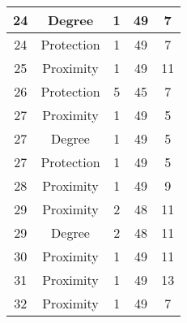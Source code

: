\documentclass[results.tex]{subfiles}
\begin{document}
\begin{center}
\begin{tabular}{| c || c | c | c | c |}
            \hline
            24                      & Degree                       & 1                      & 49                      & 7                    \\
            \hline
            24                      & Protection                   & 1                      & 49                      & 7                    \\
            \hline
            25                      & Proximity                    & 1                      & 49                      & 11                   \\
            \hline
            26                      & Protection                   & 5                      & 45                      & 7                    \\
            \hline
            27                      & Proximity                    & 1                      & 49                      & 5                    \\
            \hline
            27                      & Degree                       & 1                      & 49                      & 5                    \\
            \hline
            27                      & Protection                   & 1                      & 49                      & 5                    \\
            \hline
            28                      & Proximity                    & 1                      & 49                      & 9                    \\
            \hline
            29                      & Proximity                    & 2                      & 48                      & 11                   \\
            \hline
            29                      & Degree                       & 2                      & 48                      & 11                   \\
            \hline
            30                      & Proximity                    & 1                      & 49                      & 11                   \\
            \hline
            31                      & Proximity                    & 1                      & 49                      & 13                   \\
            \hline
            32                      & Proximity                    & 1                      & 49                      & 7                    \\

\end{tabular}
\end{center}
\end{document}
